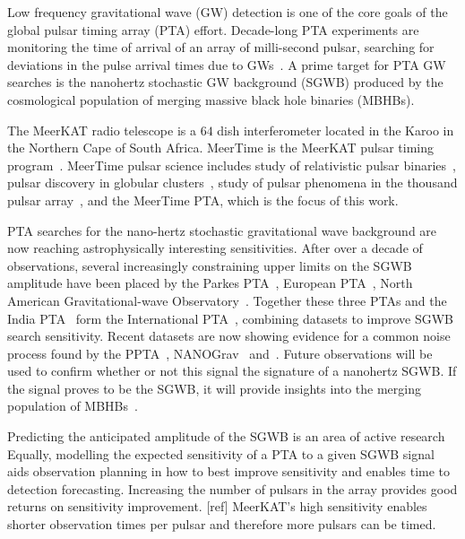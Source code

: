 




Low frequency gravitational wave (GW) detection is one of the core goals of the global pulsar timing array (PTA) effort. 
Decade-long PTA experiments are monitoring the time of arrival of an array of milli-second pulsar, searching for deviations in the pulse arrival times due to GWs~\citep{Sazhin:1978, Detweiler:1979, FosterBacker:1990}.
A prime target for PTA GW searches is the nanohertz stochastic GW background (SGWB) produced by the cosmological population of merging massive black hole binaries (MBHBs).


The MeerKAT radio telescope is a $64$ dish interferometer located in the Karoo in the Northern Cape of South Africa.
MeerTime is the MeerKAT pulsar timing program~\citep{MeerTimeBailesEtAl:2020,MeerTimeBailesEtAl:2016}. 
MeerTime pulsar science includes study of relativistic pulsar binaries~\citep{MeerTimeRelBin:2021},
pulsar discovery in globular clusters~\citep{MeerTimeGlobularClusterPSRs:2021}, study of pulsar phenomena in the thousand pulsar array~\citep{MeerTime1000PSR:2020,MeerTime1000PSR:2021}, and the MeerTime PTA, which is the focus of this work. 


PTA searches for the nano-hertz stochastic gravitational wave background are now reaching astrophysically interesting sensitivities. 
After over a decade of observations, several increasingly constraining upper limits on the SGWB amplitude have been placed by the Parkes PTA~\citep[PPTA][]{PPTAUL:2015}, European PTA~\citep[EPTA][]{EPTAUL:2015}, North American Gravitational-wave Observatory~\citep[NANOGrav][]{NANOGrav11yrUL:2018}. 
Together these three PTAs and the India PTA~\cite{JoshiEtAl:2018} form the International PTA~\citep[IPTA][]{IPTA:2016}, combining datasets to improve SGWB search sensitivity. 
Recent datasets are now showing evidence for a common noise process found by the PPTA~\cite{GoncharovEtAlPPTA:2021}, NANOGrav~\cite{NANOGrav12.5GWB:2020} and~.
Future observations will be used to confirm whether or not this signal the signature of a nanohertz SGWB. 
If the signal proves to be the SGWB, it will provide insights into the merging population of MBHBs~\citep{MiddEtAl:2021, CaseyClydeEtAl:2021}. 


Predicting the anticipated amplitude of the SGWB is an area of active research~\citep[see, for example][]{SykesEtAlInPrep:2021, KelleyEtAl:2017, Sesana:2013}
Equally, modelling the expected sensitivity of a PTA to a given SGWB signal aids observation planning in how to best improve sensitivity and enables time to detection forecasting.
Increasing the number of pulsars in the array provides good returns on sensitivity improvement. [ref]
MeerKAT's high sensitivity enables shorter observation times per pulsar and therefore more pulsars can be timed. 



